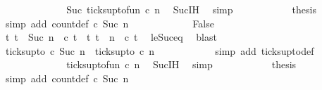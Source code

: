 \begin{isabellebody}
\ \ \ \ \ \ \ \ \isamarkupfalse%
\ \isamarkupfalse%
\ {\isacartoucheopen}{\isachardot}{\isachardot}{\isachardot}\ {\isacharequal}\ Suc\ {\isacharparenleft}ticks{\isacharunderscore}up{\isacharunderscore}to{\isacharunderscore}fun\ c\ n{\isacharparenright}{\isacartoucheclose}\ \isamarkupfalse%
\ Suc{\isachardot}IH\ \isamarkupfalse%
\ simp\isanewline
\ \ \ \ \ \ \ \ \isamarkupfalse%
\ \isamarkupfalse%
\ {\isacharquery}thesis\ \isamarkupfalse%
\ {\isacharparenleft}simp\ add{\isacharcolon}\ count{\isacharunderscore}def\ {\isacartoucheopen}c\ {\isacharparenleft}Suc\ n{\isacharparenright}{\isacartoucheclose}{\isacharparenright}\isanewline
\ \ \ \ \isamarkupfalse%
\isanewline
\ \ \ \ \ \ \isamarkupfalse%
\ False\isanewline
\ \ \ \ \ \ \ \ \isamarkupfalse%
\ {\isacartoucheopen}{\isacharbraceleft}t{\isachardot}\ t\ {\isasymle}\ Suc\ n\ {\isasymand}\ c\ t{\isacharbraceright}\ {\isacharequal}\ {\isacharbraceleft}t{\isachardot}\ t\ {\isasymle}\ n\ {\isasymand}\ c\ t{\isacharbraceright}{\isacartoucheclose}\ \isamarkupfalse%
\ le{\isacharunderscore}Suc{\isacharunderscore}eq\ \isamarkupfalse%
\ blast\isanewline
\ \ \ \ \ \ \ \ \isamarkupfalse%
\ {\isacartoucheopen}ticks{\isacharunderscore}up{\isacharunderscore}to\ c\ {\isacharparenleft}Suc\ n{\isacharparenright}\ {\isacharequal}\ ticks{\isacharunderscore}up{\isacharunderscore}to\ c\ n{\isacartoucheclose}\isanewline
\ \ \ \ \ \ \ \ \ \ \isamarkupfalse%
\ {\isacharparenleft}simp\ add{\isacharcolon}\ ticks{\isacharunderscore}up{\isacharunderscore}to{\isacharunderscore}def{\isacharparenright}\isanewline
\ \ \ \ \ \ \ \ \isamarkupfalse%
\ \isamarkupfalse%
\ {\isacartoucheopen}{\isachardot}{\isachardot}{\isachardot}\ {\isacharequal}\ ticks{\isacharunderscore}up{\isacharunderscore}to{\isacharunderscore}fun\ c\ n{\isacartoucheclose}\ \isamarkupfalse%
\ Suc{\isachardot}IH\ \isamarkupfalse%
\ simp\isanewline
\ \ \ \ \ \ \ \ \isamarkupfalse%
\ \isamarkupfalse%
\ {\isacharquery}thesis\ \isamarkupfalse%
\ {\isacharparenleft}simp\ add{\isacharcolon}\ count{\isacharunderscore}def\ {\isacartoucheopen}{\isasymnot}c\ {\isacharparenleft}Suc\ n{\isacharparenright}{\isacartoucheclose}{\isacharparenright}\isanewline
\ \ \ \ \isamarkupfalse%
\isanewline
{}\isamarkupfalse%

\end{isabellebody}
